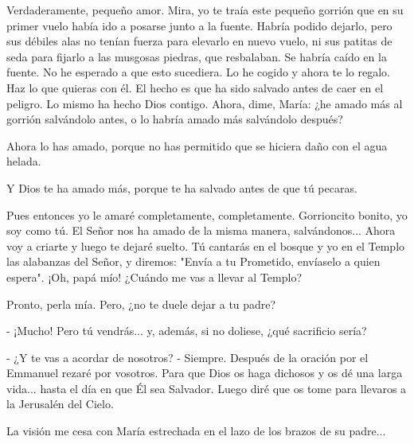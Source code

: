 \documentclass[12pt, twoside, openright]{book} %
\begin{document}
Verdaderamente, pequeño amor. Mira, yo te traía este pequeño gorrión que en su primer vuelo había ido a posarse junto a la fuente. Habría podido dejarlo, pero sus débiles alas no tenían fuerza para elevarlo en nuevo vuelo, ni sus patitas de seda para fijarlo a las musgosas piedras, que resbalaban. Se habría caído en la fuente. No he esperado a que esto sucediera. Lo he cogido y ahora te lo regalo. Haz lo que quieras con él. El hecho es que ha sido salvado antes de caer en el peligro. Lo mismo ha hecho Dios contigo. Ahora, dime, María: ¿he amado más al gorrión salvándolo antes, o lo habría amado más salvándolo después? 

Ahora lo has amado, porque no has permitido que se hiciera daño con el agua helada. 

Y Dios te ha amado más, porque te ha salvado antes de que tú pecaras. 

Pues entonces yo le amaré completamente, completamente. Gorrioncito bonito, yo soy como tú. El Señor nos ha amado de la misma manera, salvándonos... Ahora voy a criarte y luego te dejaré suelto. Tú cantarás en el bosque y yo en el Templo las alabanzas del Señor, y diremos: "Envía a tu Prometido, envíaselo a quien espera". ¡Oh, papá mío! ¿Cuándo me vas a llevar al Templo? 

Pronto, perla mía. Pero, ¿no te duele dejar a tu padre? 

- ¡Mucho! Pero tú vendrás... y, además, si no doliese, ¿qué sacrificio sería? 

 - ¿Y te vas a acordar de nosotros? - Siempre. Después de la oración por el Emmanuel rezaré por vosotros. Para que Dios os haga dichosos y os dé una larga vida... hasta el día en que Él sea Salvador. Luego diré que os tome para llevaros a la Jerusalén del Cielo. 

La visión me cesa con María estrechada en el lazo de los brazos de su padre... 
\end{document}
